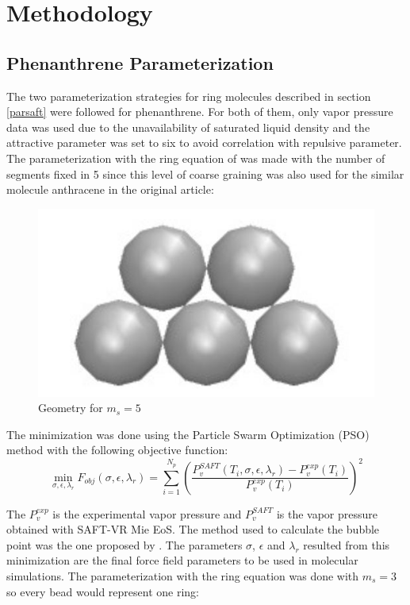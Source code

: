 \chapter{Methodology} %

\label{Chapter4} %

\section{Phenanthrene Parameterization}

The two parameterization strategies for ring molecules described in section \ref{parsaft} were followed for phenanthrene. For both of them, only vapor pressure data \cite{pvphen} was used due to the unavailability of saturated liquid density and the attractive parameter was set to six to avoid correlation with repulsive parameter. The parameterization with the ring equation of  was made with the number of segments fixed in 5 since this level of coarse graining was also used for the similar molecule anthracene in the original article:
\begin{figure}[th]
\centering
\includegraphics[width=0.25\linewidth]{Figures/fen5}
\caption{Geometry for $m_{s}=5$}
\label{fig:fen5}
\end{figure}

The minimization was done using the Particle Swarm Optimization (PSO) method with the following objective function:
\begin{equation}
\min\limits_{\sigma,\epsilon,\lambda_{r}} F_{obj}(\sigma,\epsilon,\lambda_{r})= \sum_{i=1}^{N_{p}} \left(\frac{P_{v}^{SAFT}(T_{i},\sigma,\epsilon,\lambda_{r})-P_{v}^{exp}(T_{i})}{P_{v}^{exp}(T_{i})} \right)^2
\label{eqn:fobjm}
\end{equation}

The $P_{v}^{exp}$ is the experimental vapor pressure and $P_{v}^{SAFT}$ is the vapor pressure obtained with SAFT-VR Mie EoS. The method used to calculate the bubble point was the one proposed by . The parameters $\sigma$, $\epsilon $ and $\lambda _{r}$ resulted from this minimization are the final force field parameters to be used in molecular simulations. The parameterization with the  ring equation was done with $m_{s}=3$ so every bead would represent one ring:


